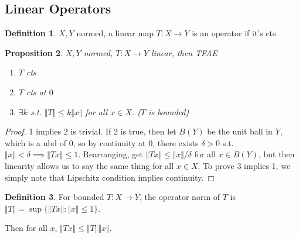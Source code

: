 \documentclass{article}
\theoremstyle{definition}
\newtheorem{defn}{Definition}[section]
\theoremstyle{remark}
\theoremstyle{plain}
\newtheorem{prop}[defn]{Proposition}
\begin{document}
\subsection{Linear Operators}
\begin{defn}
    $X,Y$ normed, a linear map $T:X\to Y$ is an operator if it's cts.
\end{defn}
\begin{prop}
    $X,Y$ normed, $T:X\to Y$ linear, then TFAE
    \begin{enumerate}
        \item $T$ cts
        \item $T$ cts at $0$
        \item $\exists k$ s.t. $\Vert T\Vert\le k\Vert x\Vert$ for all $x\in X$. ($T$ is bounded)
    \end{enumerate}
\end{prop}
\begin{proof}
    1 implies 2 is trivial. If 2 is true, then let $B(Y)$ be the unit ball in $Y$, which is a nbd of $0$, so by continuity at $0$, there exists $\delta>0$ s.t. $\Vert x\Vert<\delta\implies \Vert Tx\Vert\le 1$. Rearranging, get $\Vert Tx\Vert\le \Vert x\Vert/\delta$ for all $x\in B(Y)$, but then linearity allows us to say the same thing for all $x\in X$. To prove 3 implies 1, we simply note that Lipschitz condition implies continuity.
\end{proof}
\begin{defn}
    For bounded $T:X\to Y$, the operator norm of $T$ is $\Vert T\Vert=\sup\{\Vert Tx\Vert:\Vert x\Vert\le 1\}$.
\end{defn}
Then for all $x$, $\Vert Tx\Vert\le \Vert T\Vert\Vert x\Vert$.
\end{document}
